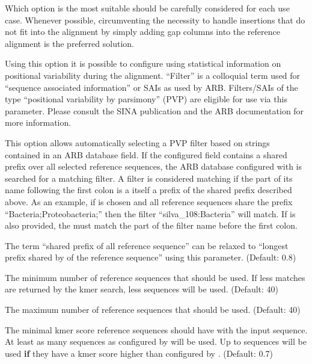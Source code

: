 \documentclass[english,a4paper]{article}
\begin{document}
\begin{Description}
Which option is the most suitable should be carefully considered for each use case. Whenever possible, 
circumventing the necessity to handle insertions that do not fit into the alignment by simply
adding gap columns into the reference alignment is the preferred solution.
\item[\OptArg{-{}-filter }{filtername}]
Using this option it is possible to configure using statistical information on positional variability
during the alignment. ``Filter'' is a colloquial term used for ``sequence associated information'' or 
SAIs as used by ARB. Filters/SAIs of the type ``positional variability by parsimony''
(PVP) are eligible for use via this parameter. Please consult the SINA publication and the ARB 
documentation for more information.
\item[\OptArg{-{}-auto-filter-field }{fieldname}]
This option allows automatically selecting a PVP filter based on strings contained in an ARB database 
field. If the configured field contains a shared prefix over all selected reference sequences, the 
ARB database configured with  is searched for a matching filter. A filter is considered matching
if the part of its name following the first colon is a itself a prefix of the shared prefix described above.
As an example, if  is chosen and all reference sequences share the prefix 
``Bacteria;Proteobacteria;'' then the filter ``silva\_108:Bacteria'' will match. If  is also
provided, the  must match the part of the filter name before the first colon. 
\item[\OptArg{-{}-auto-filter-threshold }{value}]
The term ``shared prefix of all reference sequence'' can be relaxed to ``longest prefix shared by  of 
the reference sequence'' using this parameter. (Default: 0.8)
\item[\OptArg{-{}-fs-min }{value}]
The minimum number of reference sequences that should be used. If less matches are returned by the 
kmer search, less sequences will be used. (Default: 40)
\item[\OptArg{-{}-fs-max }{value}]
The maximum number of reference sequences that should be used. (Default: 40)
\item[\OptArg{-{}-fs-msc }{value}]
The minimal kmer score reference sequences should have with the input sequence. At least as many sequences
as configured by  will be used. Up to  sequences will be used \textbf{if} they have a kmer score higher than configured by .  (Default: 0.7)

\end{Description}
\end{document}
